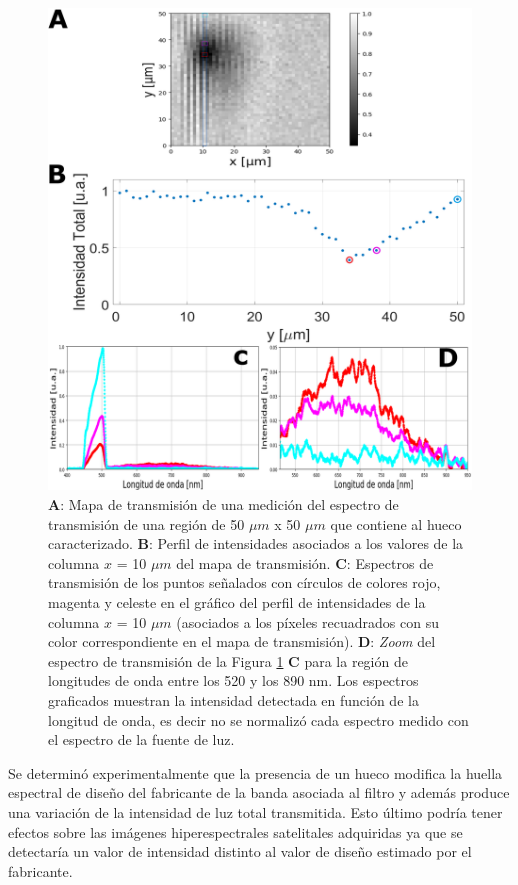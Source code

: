  \begin{figure}[H]
	\centering
	\includegraphics[width=1.0\textwidth]{Figs/microespectrometro/huecotranscondetalles.png}
	\caption{\textbf{A}: Mapa de transmisión de una medición del espectro de transmisión de una región de 50 $\mu m$ x 50 $\mu m$ que contiene al hueco caracterizado.  \textbf{B}: Perfil de intensidades asociados a los valores de la columna $\textit{x}$ = 10 $\mu m$ del mapa de transmisión. \textbf{C}: Espectros de transmisión de los puntos señalados con círculos de colores rojo, magenta y celeste en el gráfico del perfil de intensidades de la columna $\textit{x}$ = 10 $\mu m$ (asociados a los píxeles recuadrados con su color correspondiente en el mapa de transmisión). \textbf{D}: \textit{Zoom} del espectro de transmisión de la Figura \ref{fig:huecotr} \textbf{C} para la región de longitudes de onda entre los 520 y los 890 nm. Los espectros graficados muestran la intensidad detectada en función de la longitud de onda, es decir no se normalizó cada espectro medido con el espectro de la fuente de luz.}
	\label{fig:huecotr}
\end{figure}



Se determinó experimentalmente que la presencia de un hueco modifica la huella espectral de diseño del fabricante de la banda asociada al filtro y además produce una variación de la intensidad de luz total transmitida. Esto último podría tener efectos sobre las imágenes hiperespectrales satelitales adquiridas ya que se detectaría un valor de intensidad distinto al valor de diseño estimado por el fabricante.